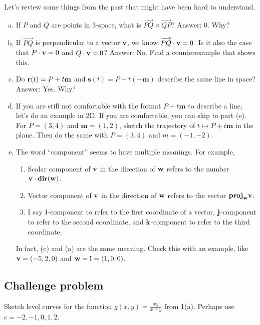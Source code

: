 \documentclass[11pt,oneside]{amsart}
\theoremstyle{definition}
\begin{document}
  \begin{problem}
    Let's review some things from the past that might have been hard to understand.
    \leavevmode\begin{enumerate}[(a)]
      \item If $P$ and $Q$ are points in 3-space, what is $\overrightarrow{PQ}\times\overrightarrow{QP}$? Answer: 0. Why?
      \item If $\overrightarrow{PQ}$ is perpendicular to a vector $\mathbf v$, we know $\overrightarrow{PQ}\cdot\mathbf v=0$. Is it also the case that $P\cdot\mathbf v=0$ and $Q\cdot\mathbf v=0$? Answer: No. Find a counterexample that shows this.
      \item Do $\mathbf r(t)=P+t\mathbf m$ and $\mathbf s(t)=P+t(-\mathbf m)$ describe the same line in space? Answer: Yes. Why?
      \item If you are still not comfortable with the format $P+t\mathbf m$ to describe a line, let's do an example in 2D. If you are comfortable, you can skip to part (e). For $P=(3,4)$ and $\mathbf m=(1,2)$, sketch the trajectory of $t\mapsto P+t\mathbf m$ in the plane. Then do the same with $P=(3,4)$ and $m=(-1,-2)$.
      \item The word ``component'' seems to have multiple meanings. For example,
      \begin{enumerate}
        \item Scalar component of $\mathbf v$ in the direction of $\mathbf w$ refers to the number $\mathbf v\cdot\operatorname{\mathbf{dir}}(\mathbf w)$.
        \item Vector component of $\mathbf v$ in the direction of $\mathbf w$ refers to the vector $\mathbf{proj}_\mathbf w\mathbf v$.
        \item I say $\mathbf i$-component to refer to the first coordinate of a vector, $\mathbf j$-component to refer to the second coordinate, and $\mathbf k$-component to refer to the third coordinate.
      \end{enumerate}
      In fact, (c) and (a) are the same meaning. Check this with an example, like $\mathbf v=(-5,2,0)$ and $\mathbf w=\mathbf i=(1,0,0)$.
    \end{enumerate}
  \end{problem}

\subsection*{Challenge problem}
Sketch level curves for the function $g(x,y)=\frac{xy}{x+y}$ from 1(a). Perhaps use $c=-2,-1,0,1,2$.
\end{document}
